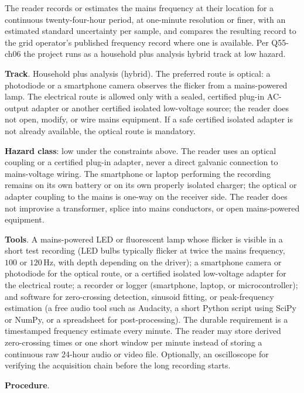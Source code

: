 \begin{project}
The reader records or estimates the mains frequency at their
location for a continuous twenty-four-hour period, at one-minute
resolution or finer, with an estimated standard uncertainty per
sample, and compares the resulting record to the grid operator's
published frequency record where one is available. Per Q55-ch06 the
project runs as a household plus analysis hybrid track at low
hazard.

\textbf{Track}. Household plus analysis (hybrid). The preferred
route is optical: a photodiode or a smartphone camera observes the
flicker from a mains-powered lamp. The electrical route is allowed
only with a sealed, certified plug-in AC-output adapter or another
certified isolated low-voltage source; the reader does not open,
modify, or wire mains equipment. If a safe certified isolated
adapter is not already available, the optical route is mandatory.

\textbf{Hazard class}: low under the constraints above. The reader
uses an optical coupling or a certified plug-in adapter, never a
direct galvanic connection to mains-voltage wiring. The smartphone
or laptop performing the recording remains on its own battery or
on its own properly isolated charger; the optical or adapter
coupling to the mains is one-way on the receiver side. The reader
does not improvise a transformer, splice into mains conductors, or
open mains-powered equipment.

\textbf{Tools}. A mains-powered LED or fluorescent lamp whose
flicker is visible in a short test recording (LED bulbs typically
flicker at twice the mains frequency, $100$ or $120 \,\si{\hertz}$,
with depth depending on the driver); a smartphone camera or
photodiode for the optical route, or a certified isolated
low-voltage adapter for the electrical route; a recorder or logger
(smartphone, laptop, or microcontroller); and software for
zero-crossing detection, sinusoid fitting, or peak-frequency
estimation (a free audio tool such as Audacity, a short Python
script using SciPy or NumPy, or a spreadsheet for post-processing).
The durable requirement is a timestamped frequency estimate every
minute. The reader may store derived zero-crossing times or one
short window per minute instead of storing a continuous raw
24-hour audio or video file. Optionally, an oscilloscope for
verifying the acquisition chain before the long recording starts.

\textbf{Procedure}.


\end{project}
